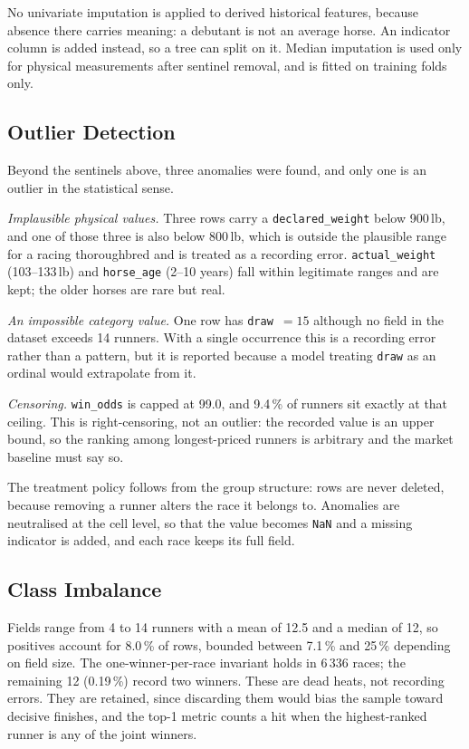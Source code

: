 No univariate imputation is applied to derived historical features,
because absence there carries meaning: a debutant is not an average horse.
An indicator column is added instead, so a tree can split on it. Median
imputation is used only for physical measurements after sentinel removal,
and is fitted on training folds only.

\subsection{Outlier Detection}
\label{sec:outliers}

Beyond the sentinels above, three anomalies were found, and only one is an
outlier in the statistical sense.

\emph{Implausible physical values.} Three rows carry a
\texttt{declared\_weight} below 900\,lb, and one of those three is also
below 800\,lb, which is
outside the plausible range for a racing thoroughbred and is treated as a
recording error. \texttt{actual\_weight} (103--133\,lb) and
\texttt{horse\_age} (2--10 years) fall within legitimate ranges and are
kept; the older horses are rare but real.

\emph{An impossible category value.} One row has \texttt{draw}~$=15$
although no field in the dataset exceeds 14 runners. With a single
occurrence this is a recording error rather than a pattern, but it is
reported because a model treating \texttt{draw} as an ordinal would
extrapolate from it.

\emph{Censoring.} \texttt{win\_odds} is capped at 99.0, and 9.4\,\% of
runners sit exactly at that ceiling. This is right-censoring, not an
outlier: the recorded value is an upper bound, so the ranking among
longest-priced runners is arbitrary and the market baseline must say so.

The treatment policy follows from the group structure: rows are never
deleted, because removing a runner alters the race it belongs to.
Anomalies are neutralised at the cell level, so that the value becomes
\texttt{NaN} and a missing indicator is added, and each race keeps its
full field.

\subsection{Class Imbalance}
\label{sec:imbalance}

Fields range from 4 to 14 runners with a mean of 12.5 and a median of 12,
so positives account for 8.0\,\% of rows, bounded between 7.1\,\% and
25\,\% depending on field size. The one-winner-per-race invariant holds in
6\,336 races; the remaining 12 (0.19\,\%) record two winners. These are
dead heats, not recording errors. They are retained, since discarding them
would bias the sample toward decisive finishes, and the top-1 metric counts
a hit when the highest-ranked runner is any of the joint winners.

